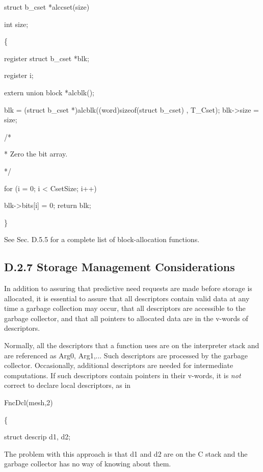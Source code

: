 {\ttfamily\mdseries
struct b\_cset *alccset(size)}

{\ttfamily\mdseries
int size;}

{\ttfamily\mdseries
\{}

{\ttfamily\mdseries
register struct b\_cset *blk;}

{\ttfamily\mdseries
register i;}

{\ttfamily\mdseries
extern union block *alcblk();}

{\ttfamily\mdseries
blk = (struct b\_cset *)alcblk((word)sizeof(struct b\_cset) , T\_Cset); blk-{\textgreater}size = size;}

{\ttfamily\mdseries
/*}

{\ttfamily\mdseries
* Zero the bit array.}

{\ttfamily\mdseries
*/}

{\ttfamily\mdseries
for (i = 0; i {\textless} CsetSize; i++)}

{\ttfamily\mdseries
blk-{\textgreater}bits[i] = 0; return blk;}


\}


See Sec. D.5.5 for a complete list of block-allocation functions.

\subsection{D.2.7 Storage Management Considerations}

In addition to assuring that predictive need requests are made before
storage is allocated, it is essential to assure that all descriptors
contain valid data at any time a garbage collection may occur, that
all descriptors are accessible to the garbage collector, and that all
pointers to allocated data are in the v-words of descriptors.

Normally, all the descriptors that a function uses are on the
interpreter stack and are referenced as Arg0, Arg1,... Such
descriptors are processed by the garbage collector. Occasionally,
additional descriptors are needed for intermediate computations. If
such descriptors contain pointers in their v-words, it is \textit{not}
correct to declare local descriptors, as in

{\ttfamily\mdseries
FncDcl(mesh,2)}

{\ttfamily\mdseries
\{}

{\ttfamily\mdseries
struct descrip d1, d2;}


The problem with this approach is that d1 and d2 are on the C stack
and the garbage collector has no way of knowing about them.

